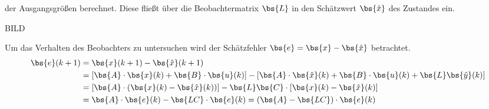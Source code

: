 der Ausgangsgrößen berechnet. Diese fließt über die Beobachtermatrix $\bs{L}$ in den Schätzwert $\bs{\hat{x}}$ des Zustandes ein.

BILD

Um das Verhalten des Beobachters zu untersuchen wird der Schätzfehler $\bs{e} = \bs{x} - \bs{\hat{x}}$ betrachtet.
\begin{equation}
\begin{split}
\bs{e}(k+1) &= \bs{x}(k+1) - \bs{\hat{x}}(k+1) \\
&= [\bs{A}\cdot \bs{x}(k) + \bs{B}\cdot \bs{u}(k)] - [\bs{A}\cdot \bs{\hat{x}}(k) + \bs{B}\cdot \bs{u}(k) +\bs{L}\bs{\hat{y}}(k)]
\\
&= [\bs{A}\cdot (\bs{x}(k) - \bs{\hat{x}}(k))] - \bs{L}\bs{C}\cdot[\bs{x}(k)-\bs{\hat{x}}(k)] 
\\
&= \bs{A}\cdot \bs{e}(k) - \bs{LC}\cdot\bs{e}(k) = (\bs{A}-\bs{LC})\cdot \bs{e}(k)
\end{split}
\end{equation}